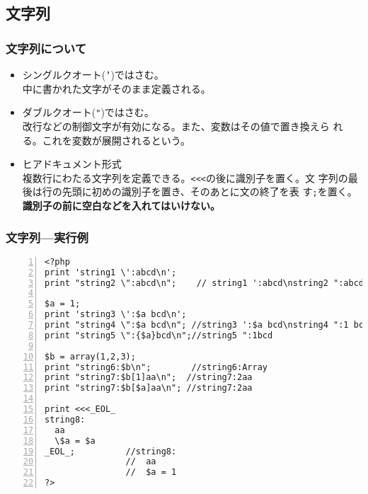 \subsection{文字列}
\begin{frame}[containsverbatim]
\frametitle{文字列について}
\begin{itemize}
 \item シングルクオート(\texttt{'})ではさむ。\\
   中に書かれた文字がそのまま定義される。
 \item ダブルクオート(\verb+"+)ではさむ。\\%
       改行などの制御文字が有効になる。また、変数はその値で置き換えら
       れる。これを変数が展開されるという。
 \item ヒアドキュメント形式\\
   複数行にわたる文字列を定義できる。\texttt{<<<}の後に識別子を置く。文
       字列の最後は行の先頭に初めの識別子を置き、そのあとに文の終了を表
       す\texttt{;}を置く。{\bfseries 識別子の前に空白などを入れてはいけない。}
\end{itemize}
\end{frame}
\begin{frame}[containsverbatim]
\frametitle{文字列---実行例}
\begin{Verbatim}[numbers=left,fontsize=\scriptsize]
<?php
print 'string1 \':abcd\n';
print "string2 \":abcd\n";    // string1 ':abcd\nstring2 ":abcd

$a = 1;
print 'string3 \':$a bcd\n';
print "string4 \":$a bcd\n"; //string3 ':$a bcd\nstring4 ":1 bcd
print "string5 \":{$a}bcd\n";//string5 ":1bcd

$b = array(1,2,3);
print "string6:$b\n";        //string6:Array
print "string7:$b[1]aa\n";  //string7:2aa
print "string7:$b[$a]aa\n"; //string7:2aa

print <<<_EOL_
string8:
  aa
  \$a = $a
_EOL_;          //string8:
                //  aa
                //  $a = 1
?>
\end{Verbatim}
\end{frame}
